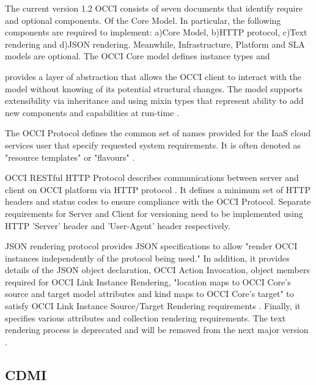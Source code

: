 {     The current version 1.2 OCCI consists of seven documents that
     identify require and optional components. Of the Core Model.  In
     particular, the following components are required to implement:
     a)Core Model, b)HTTP protocol, c)Text rendering and d)JSON
     rendering. Meanwhile, Infrastructure, Platform and SLA models are
     optional.  The OCCI Core model defines instance types and

     provides a layer of abstraction that allows the OCCI client
     to interact with the model without knowing of its potential
     structural changes. The model supports extensibility via
     inheritance and using mixin types that represent ability to
     add new components and capabilities at run-time
     \cite{nyren-edmonds-papaspyrou-2016}.

     The OCCI Protocol defines the common set of names provided
     for the IaaS cloud services user that specify requested
     system requirements. It is often denoted as "resource
     templates" or "flavours"   \cite{drescher-parak-wallom-2015}.

     OCCI RESTful HTTP Protocol describes communications between
     server and client on OCCI platform via HTTP protocol
     \cite{nyren-edmonds-metsch-2016}. It defines a minimum set of HTTP
     headers and status codes to ensure compliance with the
     OCCI Protocol. Separate requirements for Server and Client
     for versioning need to be implemented using HTTP 'Server'
     header and 'User-Agent' header respectively.

     JSON rendering protocol provides
     JSON specifications to allow "render OCCI instances
     independently of the protocol being used." In addition, it
     provides details of the JSON object declaration, OCCI Action
     Invocation, object members required for OCCI Link Instance
     Rendering, "location maps to OCCI Core's source and target
     model attributes and kind maps to OCCI Core's target" to
     satisfy OCCI Link Instance Source/Target
     Rendering requirements \cite{nyren-feldhaus-parak-2016}.
     Finally, it specifies various attributes and collection
     rendering requirements.
     The text rendering process is deprecated and will be
     removed from the next major version  \cite{edmonds-metsch-2016}.

     \pv
	 
\subsection{CDMI}

}
